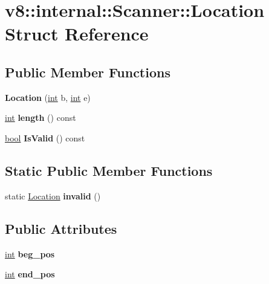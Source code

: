 \hypertarget{structv8_1_1internal_1_1Scanner_1_1Location}{}\section{v8\+:\+:internal\+:\+:Scanner\+:\+:Location Struct Reference}
\label{structv8_1_1internal_1_1Scanner_1_1Location}
\subsection*{Public Member Functions}
\begin{DoxyCompactItemize}
\item 
\mbox{\label{structv8_1_1internal_1_1Scanner_1_1Location_af089d35d57d66e0ff0e4558ce445494d}} 
{\bfseries Location} (\mbox{\hyperlink{classint}{int}} b, \mbox{\hyperlink{classint}{int}} e)
\item 
\mbox{\label{structv8_1_1internal_1_1Scanner_1_1Location_a1154389362ef5d5874a1cc190fd38783}} 
\mbox{\hyperlink{classint}{int}} {\bfseries length} () const
\item 
\mbox{\label{structv8_1_1internal_1_1Scanner_1_1Location_a8eb6cc2ff07bfbb5c86be7f3cdafddc4}} 
\mbox{\hyperlink{classbool}{bool}} {\bfseries Is\+Valid} () const
\end{DoxyCompactItemize}
\subsection*{Static Public Member Functions}
\begin{DoxyCompactItemize}
\item 
\mbox{\label{structv8_1_1internal_1_1Scanner_1_1Location_aca07bb7c787fa37e598ec7a18d947ac5}} 
static \mbox{\hyperlink{structv8_1_1internal_1_1Scanner_1_1Location}{Location}} {\bfseries invalid} ()
\end{DoxyCompactItemize}
\subsection*{Public Attributes}
\begin{DoxyCompactItemize}
\item 
\mbox{\label{structv8_1_1internal_1_1Scanner_1_1Location_a04a6e70dca2ccfa5072520c84de16eab}} 
\mbox{\hyperlink{classint}{int}} {\bfseries beg\+\_\+pos}
\item 
\mbox{\label{structv8_1_1internal_1_1Scanner_1_1Location_a0beaf28ea5c585f2560af74bb2c53ab4}} 
\mbox{\hyperlink{classint}{int}} {\bfseries end\+\_\+pos}
\end{DoxyCompactItemize}


